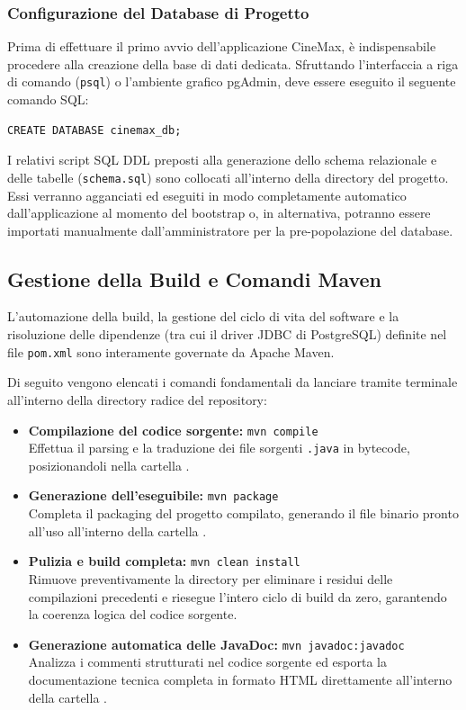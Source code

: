 \documentclass{article}
\begin{document}
\subsubsection{Configurazione del Database di Progetto}
Prima di effettuare il primo avvio dell'applicazione CineMax, è indispensabile procedere alla creazione della base di dati dedicata. Sfruttando l'interfaccia a riga di comando (\texttt{psql}) o l'ambiente grafico pgAdmin, deve essere eseguito il seguente comando SQL:
\begin{verbatim}
CREATE DATABASE cinemax_db;
\end{verbatim}
I relativi script SQL DDL preposti alla generazione dello schema relazionale e delle tabelle (\texttt{schema.sql}) sono collocati all'interno della directory  del progetto. Essi verranno agganciati ed eseguiti in modo completamente automatico dall'applicazione al momento del bootstrap o, in alternativa, potranno essere importati manualmente dall'amministratore per la pre-popolazione del database.

\subsection{Gestione della Build e Comandi Maven}
L'automazione della build, la gestione del ciclo di vita del software e la risoluzione delle dipendenze (tra cui il driver JDBC di PostgreSQL) definite nel file \texttt{pom.xml} sono interamente governate da Apache Maven. 

Di seguito vengono elencati i comandi fondamentali da lanciare tramite terminale all'interno della directory radice del repository:
\begin{itemize}
    \item \textbf{Compilazione del codice sorgente:} \texttt{mvn compile} \\ Effettua il parsing e la traduzione dei file sorgenti \texttt{.java} in bytecode, posizionandoli nella cartella .
    \item \textbf{Generazione dell'eseguibile:} \texttt{mvn package} \\ Completa il packaging del progetto compilato, generando il file binario pronto all'uso all'interno della cartella .
    \item \textbf{Pulizia e build completa:} \texttt{mvn clean install} \\ Rimuove preventivamente la directory  per eliminare i residui delle compilazioni precedenti e riesegue l'intero ciclo di build da zero, garantendo la coerenza logica del codice sorgente.
    \item \textbf{Generazione automatica delle JavaDoc:} \texttt{mvn javadoc:javadoc} \\ Analizza i commenti strutturati nel codice sorgente ed esporta la documentazione tecnica completa in formato HTML direttamente all'interno della cartella .
\end{itemize}
\end{document}

